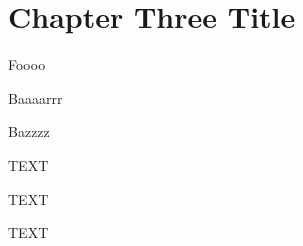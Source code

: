 \documentclass[../main]{subfiles}
\begin{document}
\chapter{Chapter Three Title}

\lipsum[1-20]

Foooo~\autocite{einstein}

Baaaarrr~\autocite{knuthwebsite}

Bazzzz~\autocite{latexcompanion}

TEXT\parencite[see][p10]{latexcompanion}

TEXT\parencite[compare][]{knuthwebsite}

TEXT\parencite[e.g.][page 300]{einstein}
\end{document}
